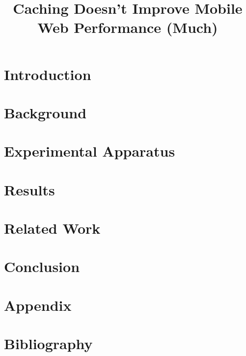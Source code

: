 \documentclass[letterpaper,10pt,twocolumn]{article}
\title{\vspace{0.04in}Caching Doesn't Improve Mobile Web Performance (Much)}
\author{\authorthing}
\begin{document}
   \date{}
   \maketitle
   \thispagestyle{empty}

\leading{12pt}
\setlength{\textfloatsep}{10pt plus 1pt minus 10pt} %

\abstract{}

\section{Introduction}
\label{sec:intro}


\section{Background}
\label{sec:background}


\section{Experimental Apparatus}
\label{sec:apparatus}


\section{Results}
\label{sec:results}


\section{Related Work}
\label{sec:related_work}


\section{Conclusion}
\label{sec:conclusion}

\clearpage

\section{Appendix}
\label{sec:appendix}

\clearpage

\section{Bibliography}
\label{sec:bibliography}


\end{document}
